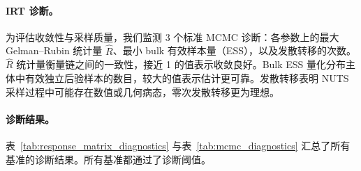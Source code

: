 \paragraph{IRT 诊断。}

为评估收敛性与采样质量，我们监测 $3$ 个标准 MCMC 诊断：各参数上的最大 Gelman–Rubin 统计量 $\hat{R}$、最小 bulk 有效样本量（ESS），以及发散转移的次数。$\hat{R}$ 统计量衡量链之间的一致性，接近 1 的值表示收敛良好。Bulk ESS 量化分布主体中有效独立后验样本的数目，较大的值表示估计更可靠。发散转移表明 NUTS 采样过程中可能存在数值或几何病态，零次发散转移更为理想。

\paragraph{诊断结果。}
表~\ref{tab:response_matrix_diagnostics} 与表~\ref{tab:mcmc_diagnostics} 汇总了所有基准的诊断结果。所有基准都通过了诊断阈值。

